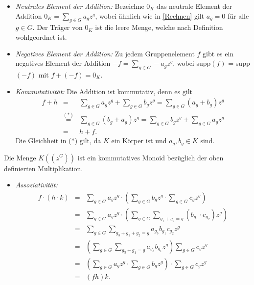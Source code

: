 {\begin{itemize}
\item \textit{Neutrales Element der Addition:} Bezeichne $0_K$ das neutrale Element der Addition $0_K = \sum_{g \in G}^{} a_g z^g$, wobei ähnlich wie in \ref{Rechnen} gilt $a_g = 0$ für alle $g \in G$. Der Träger von $0_K$ ist die leere Menge, welche nach Definition wohlgeordnet ist.
\item \textit{Negatives Element der Addition:} Zu jedem Gruppenelement $f$ gibt es ein negatives Element der Addition $-f = \sum_{g \in G}^{} -a_g z^g$, wobei supp$(f)$ = supp$(-f)$ mit $f+ \left(-f\right) = 0_K$.
\item \textit{Kommutativität:} 
Die Addition ist kommutativ, denn es gilt 
\begin{eqnarray*}
f+ h &=& \sum_{g \in G}^{} a_gz^g + \sum_{g \in G}^{} b_gz^g 
= \sum_{g \in G}^{} \left(a_g  + b_g\right) z^g \\
&\stackrel{\mathrm{(*)}}=& \sum_{g \in G}^{} \left(b_g  + a_g\right) z^g 
= \sum_{g \in G}^{} b_gz^g +  \sum_{g \in G}^{} a_gz^g \\
&=& h + f.
\end{eqnarray*}
Die Gleichheit in ($*$) gilt, da $K$ ein Körper ist und $a_g, b_g \in K$ sind.  
\end{itemize}
%
%
%
%
%
%
Die Menge $K\left(\left(z^{G}\right)\right)$ ist ein kommutatives Monoid bezüglich der oben definierten Multiplikation.
\begin{itemize}
\item \textit{Assoziativität:}
\begin{eqnarray*}
 f\cdot \left(h \cdot k\right) &= & \sum_{g \in G}^{} a_g z^g \cdot \left( \sum_{g \in G}^{} b_g z^g \cdot \sum_{g \in G}^{}c_g z^g \right) \\
&=& \sum_{g \in G}^{} a_g z^g \cdot \left( \sum_{g \in G}^{}\sum_{g_1 + g_2 = g}^{} \left(b_{g_1} \cdot c_{g_2}\right) z^g \right)\\
&=&  \sum_{g \in G}^{}\sum_{g_3 + g_1 + g_2  = g}^{} a_{g_3} b_{g_1} c_{g_2} z^g \\
& =& \left(\sum_{g \in G}^{}\sum_{g_3 + g_1 = g}^{} a_{g_3} b_{g_1}z^g\right) \sum_{g \in G}^{}c_g z^g   \\
&= &  \left(\sum_{g \in G}^{} a_g z^g \cdot \sum_{g \in G}^{} b_g z^g \right)\cdot \sum_{g \in G}^{}c_g z^g \\
&=& \left(fh\right) k .
\end{eqnarray*}
%
%
%
%
%

\end{itemize}}
